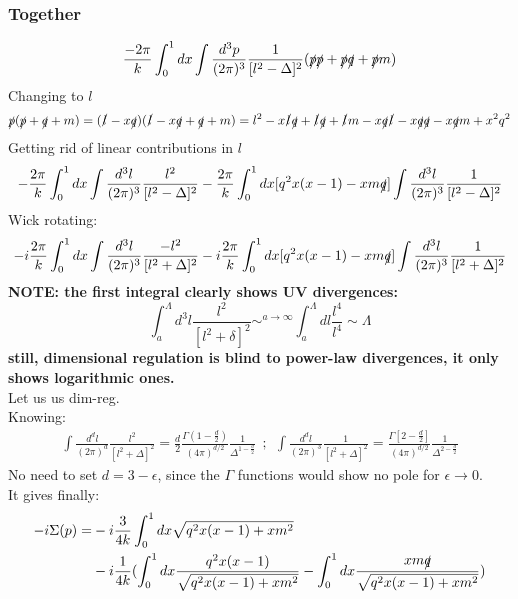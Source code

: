\documentclass[a4paper,11pt,DIV=12]{scrartcl}
\begin{document}
\subsubsection*{Together}
\begin{align*}
    \frac{-2\pi}{k}\int_0^1 dx \int \frac{d^3p}{(2\pi)^3} \frac{1}{[l^2-\Delta]^2}(\slashed{p}\slashed{p}+\slashed{p}\slashed{q}+\slashed{p}m)
\end{align*}
Changing to $l$
\begin{align*}
    \slashed{p}(\slashed{p}+\slashed{q}+m) = (\slashed{l}-x\slashed{q})(\slashed{l}-x\slashed{q}+\slashed{q}+m)=l^2 - x\slashed{l}\slashed{q} + \slashed{l}\slashed{q} + \slashed{l}m -x\slashed{q}\slashed{l}-x\slashed{q}\slashed{q} -x \slashed{q}m +x^2q^2
\end{align*}
Getting rid of linear contributions in $l$
\begin{align*}
    -\frac{2\pi}{k}\int_0^1 dx \int \frac{d^3l}{(2\pi)^3} \frac{l^2}{[l^2-\Delta]^2} - \frac{2\pi}{k}\int_0^1 dx [q^2 x(x-1)-x m \slashed{q}]\int \frac{d^3 l}{(2\pi)^3} \frac{1}{[l^2-\Delta]^2}
\end{align*}
Wick rotating:
\begin{align*}
    -i\frac{2\pi}{k}\int_0^1 dx \int \frac{d^3l}{(2\pi)^3} \frac{-l^2}{[l^2+\Delta]^2} - i\frac{2\pi}{k}\int_0^1 dx [q^2 x(x-1)-x m \slashed{q}]\int \frac{d^3 l}{(2\pi)^3} \frac{1}{[l^2+\Delta]^2}
\end{align*}
\textbf{NOTE: the first integral clearly shows UV divergences:}
\begin{equation*}
    \int_a^\Lambda d^3 l \frac{l^2}{[l^2+\delta]^2} \sim^{a\to \infty} \int_a^\Lambda dl \frac{l^4}{l^4}\sim \Lambda
\end{equation*}
\textbf{still, dimensional regulation is blind to power-law divergences, it only shows logarithmic ones.}\\
Let us us dim-reg.\\
Knowing:
\begin{align*}
    \int \frac{d^dl}{(2\pi)^d}\frac{l^2}{[l^2+\Delta]^2}=\frac{d}{2}\frac{\Gamma(1-\frac{d}{2})}{(4\pi)^{d/2}}\frac{1}{\Delta^{1-\frac{d}{2}}}\ \ ;\ \ \int \frac{d^d l}{(2\pi)^3}\frac{1}{[l^2+\Delta]^2}=\frac{\Gamma[2-\frac{d}{2}]}{(4\pi)^{d/2}}\frac{1}{\Delta^{2-\frac{d}{2}}}
\end{align*}
No need to set $d=3-\epsilon$, since the $\Gamma$ functions would show no pole for $\epsilon \to 0$.\\
It gives finally:
\begin{align*}
    -i \Sigma(p) = &-i \frac{3}{4k}\int_0^1 dx \sqrt{q^2 x(x-1)+x m^2}\\
    &-i\frac{1}{4k}(\int_0^1 dx \frac{q^2 x(x-1)}{\sqrt{q^2 x(x-1)+x m^2}} - \int_0^1 dx \frac{x m \slashed{q}}{\sqrt{q^2 x(x-1)+x m^2}})
\end{align*}
\end{document}
